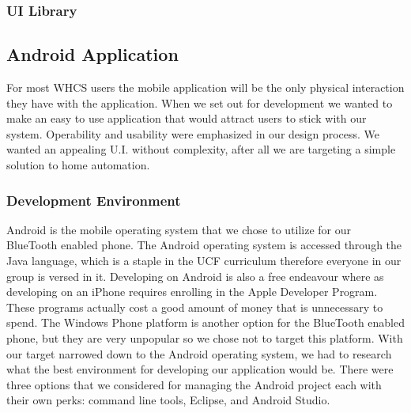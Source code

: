 
\subsubsection{UI Library}
\label{sec:ui-lib}


\subsection{Android Application} For most WHCS users the mobile application
will be the only physical interaction they have with the application. When we
set out for development we wanted to make an easy to use application that would
attract users to stick with our system.  Operability and usability were
emphasized in our design process. We wanted an appealing U.I. without
complexity, after all we are targeting a simple solution to home automation.

\subsubsection{Development Environment} Android is the mobile operating system
that we chose to utilize for our BlueTooth enabled phone. The Android operating
system is accessed through the Java language, which is a staple in the UCF
curriculum therefore everyone in our group is versed in it. Developing on
Android is also a free endeavour where as developing on an iPhone requires
enrolling in the Apple Developer Program. These programs actually cost a good
amount of money that is unnecessary to spend. The Windows Phone platform is
another option for the BlueTooth enabled phone, but they are very unpopular so
we chose not to target this platform. With our target narrowed down to the
Android operating system, we had to research what the best environment for
developing our application would be. There were three options that we
considered for managing the Android project each with their own perks: command
line tools, Eclipse, and Android Studio.

